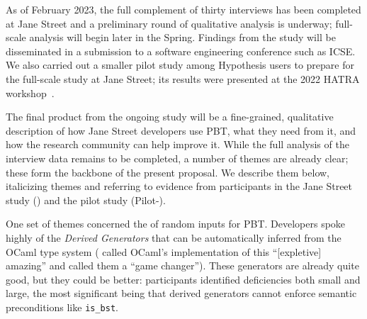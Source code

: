 As of February 2023, the full complement of thirty interviews has been
completed at Jane Street and a preliminary round of qualitative
analysis is underway; full-scale analysis will begin later in the Spring.
Findings from the study will be disseminated in a submission to a
software engineering conference such as ICSE.  We also carried out a
smaller pilot study among Hypothesis users to prepare for the
full-scale study at Jane Street; its results were presented at the
2022 HATRA workshop~\cite{goldstein_problems_2022}.

\ifthemecolors{}\fi
\newcommand{\proptheme}[1]{{\ifthemecolors\color{nord-orange}\fi \em #1}}
\newcommand{\gentheme}[1]{{\ifthemecolors\color{nord-green}\fi \em #1}}
\newcommand{\evaltheme}[1]{{\ifthemecolors\color{nord-purple}\fi \em #1}}
\newcommand{\edutheme}[1]{{\ifthemecolors\color{nord-frost4}\fi \em #1}}

The final product from
the ongoing study will be a fine-grained, qualitative description of how
Jane Street developers use PBT, what they need from it, and how the
research community can
help improve it.  While the full analysis of the interview data remains
to be completed, a number of themes are already clear; these
form the backbone of the present proposal. We describe them below,
italicizing themes and
referring to evidence from participants in the Jane Street study
()
and the pilot study (Pilot-).

One set of themes concerned the  of
random inputs for PBT. Developers spoke
highly of the \gentheme{Derived Generators} that can be automatically
inferred from
the OCaml type system ( called OCaml's implementation of this
``[expletive] amazing'' and  called them a ``game changer'').
These generators are already quite good, but they could be better: participants
identified deficiencies both small and large, the most significant being that
derived generators
cannot enforce semantic preconditions like \lstinline{is_bst}.

